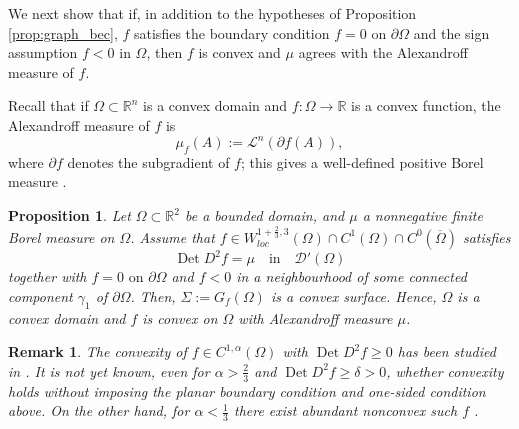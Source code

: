 \documentclass[12pt]{article}
\newcommand{\R}{\mathbb{R}}
\newcommand{\Det}{\operatorname{Det}}
\theoremstyle{plain}
\newtheorem{proposition}[theorem]{Proposition}
\newtheorem{remark}[theorem]{Remark}
\numberwithin{equation}{section}
\begin{document}
We next show that if, in addition to the hypotheses of Proposition \ref{prop:graph_bec}, $f$ satisfies the boundary condition $f = 0$ on $\partial \Omega$ and the sign assumption $f < 0$ in $\Omega$, then $f$ is convex and $\mu$ agrees with the Alexandroff measure of $f$.

Recall that if $\Omega \subset \R^n$ is a convex domain and $f : \Omega \to \R$ is a convex function, the Alexandroff measure of $f$ is
\begin{equation*}
    \mu_f(A) := \mathcal{L}^n(\partial f(A)),
\end{equation*}
where $\partial f$ denotes the subgradient of $f$; this gives a well-defined positive Borel measure \cite{figalli_19}. 

\begin{proposition} \label{prop:graph_alexandroff}
    Let $\Omega \subset \R^2$ be a bounded domain, and $\mu$ a nonnegative finite Borel measure on $\Omega$. Assume that $f \in W^{1+\frac23,3}_{loc}(\Omega) \cap C^1(\Omega) \cap C^0(\overline \Omega)$ satisfies
\begin{equation*} 
\Det D^2 f = \mu \quad \text{in} \quad \mathcal{D}'(\Omega) 
\end{equation*}
together with $f = 0 \text{ on } \partial \Omega$ and $f < 0$ in a neighbourhood of some connected component $\gamma_1$ of $\partial \Omega$. Then, $\Sigma:=G_f(\Omega)$ is a convex surface. Hence, $\Omega$ is a convex domain and $f$ is convex on $\Omega$ with Alexandroff measure $\mu$.
\end{proposition}

\begin{remark}
    The convexity of $f \in C^{1,\alpha}(\Omega)$ with $\Det D^2 f \geq 0$ has been studied in \cite{pakzad_24, lewicka_pakzad_17}. It is not yet known, even for $\alpha > \frac23$ and $\Det D^2 f \geq \delta > 0$, whether convexity holds without imposing the planar boundary condition and one-sided condition above. On the other hand, for $\alpha < \frac13$ there exist abundant nonconvex such $f$ \cite{cao_hirsch_inauen_MA_25, cao_szekelyhidi_19, lewicka_pakzad_17}.
\end{remark}
\end{document}
